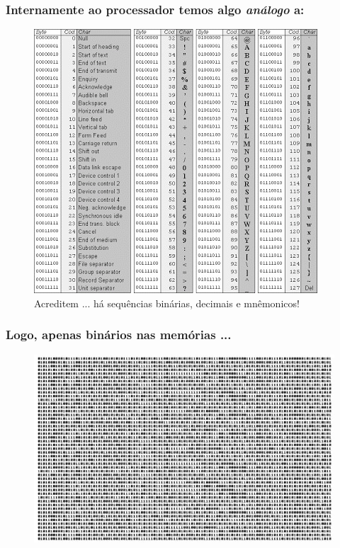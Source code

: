 \documentclass[10pt]{beamer}
\begin{document}
\begin{frame}[fragile]

\frametitle{Internamente ao processador temos algo \textit{análogo} a:}

\begin{figure}[!ht]
\centering
\includegraphics[height =.6\textheight,width=.7\textwidth]
{figuras/instrucoes_CPU.jpg}
\caption{Acreditem ... há sequências binárias, decimais e mnêmonicos!}
\end{figure}

\end{frame}


\begin{frame}[fragile]

\frametitle{Logo, apenas binários nas memórias ...}

\begin{figure}[!ht]
\centering
\includegraphics[height =.5\textheight,width=.4\textwidth]
{figuras/binarios_memoria.jpg}
\end{figure}

\end{frame}
\end{document}
